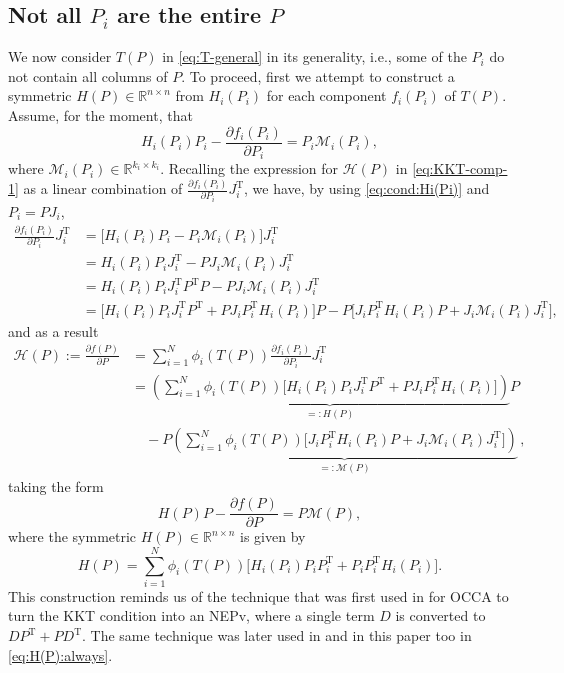\documentclass[11pt]{article}
\def\bbR{\mathbb{R}}
\def\scrH{\mathscr{H}}
\def\scrM{\mathscr{M}}
\DeclareMathOperator{\T}{T}
\theoremstyle{definition}
\numberwithin{equation}{section}
\begin{document}
\subsection{Not all $P_i$ are the entire $P$}\label{ssec:PineP}
We now consider $T(P)$ in \eqref{eq:T-general} in its generality, i.e., some of the $P_i$
do not contain all columns of $P$.
To proceed, first we attempt to construct a symmetric $H(P)\in\bbR^{n\times n}$
from $H_i(P_i)$ for each component $f_i(P_i)$ of $T(P)$.
Assume, for the moment, that
\begin{equation}\label{eq:cond:Hi(Pi)}
H_i(P_i)P_i-\frac {\partial f_i(P_i)}{\partial P_i}=P_i\scrM_i(P_i),
\end{equation}
where $\scrM_i(P_i)\in\bbR^{k_i\times k_i}$.
Recalling the expression for $\scrH(P)$ in \eqref{eq:KKT-comp-1} as a linear combination of
$\frac {\partial f_i(P_i)}{\partial P_i}J_i^{\T}$,
we have, by using \eqref{eq:cond:Hi(Pi)} and $P_i=PJ_i$,
\begin{align*}
\frac {\partial f_i(P_i)}{\partial P_i}J_i^{\T}
  &=\Big[H_i(P_i)P_i-P_i\scrM_i(P_i)\Big]J_i^{\T} \\
  &=H_i(P_i)P_iJ_i^{\T}-PJ_i\scrM_i(P_i)J_i^{\T} \\
  &=H_i(P_i)P_iJ_i^{\T}P^{\T}P-PJ_i\scrM_i(P_i)J_i^{\T} \\
  &=\Big[H_i(P_i)P_iJ_i^{\T}P^{\T}+PJ_iP_i^{\T}H_i(P_i)\Big]P-P\Big[J_iP_i^{\T}H_i(P_i)P+J_i\scrM_i(P_i)J_i^{\T}\Big],
\end{align*}
and as a result
\begin{align*}
\scrH(P):=\frac {\partial f(P)}{\partial P}
  &=\sum_{i=1}^N\phi_i(T(P))\frac {\partial f_i(P_i)}{\partial P_i}J_i^{\T} \\
  &=\underbrace{\left(\sum_{i=1}^N\phi_i(T(P))\Big[H_i(P_i)P_iJ_i^{\T}P^{\T}+PJ_iP_i^{\T}H_i(P_i)\Big]\right)}_{=:H(P)}P  \\
  &\quad-P\underbrace{\left(\sum_{i=1}^N\phi_i(T(P))\Big[J_iP_i^{\T}H_i(P_i)P+J_i\scrM_i(P_i)J_i^{\T}\Big]\right)}_{=:\scrM(P)}\,,
\end{align*}
taking the form
\begin{equation}\label{eq:H(P)-from-Hi(Pi):cond}
H(P)P-\frac {\partial f(P)}{\partial P}=P\scrM(P),
\end{equation}
where the symmetric $H(P)\in\bbR^{n\times n}$ is given by
\begin{equation}\label{eq:H(P)-comp-form:Hi(Pi)}
H(P)=\sum_{i=1}^N\phi_i(T(P))\Big[H_i(P_i)P_iP_i^{\T}+P_iP_i^{\T}H_i(P_i)\Big].
\end{equation}
This construction reminds us of the technique that was first used in \cite{zhwb:2022} for OCCA to turn the KKT condition
into an NEPv, where a single term $D$ is converted to $DP^{\T}+PD^{\T}$. The same technique was later used in
\cite{zhys:2020,wazl:2023,wazl:2022a} and in this paper too in \eqref{eq:H(P):always}.
\end{document}

